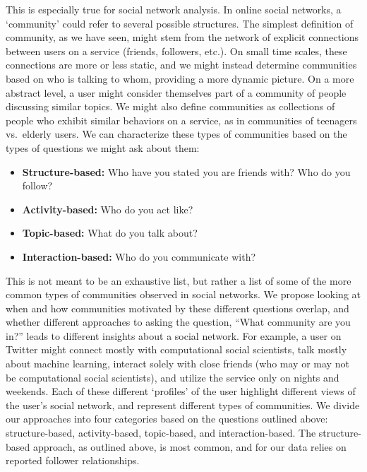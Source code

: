 This is especially true for social network analysis. In online social networks, a `community' could refer to several possible structures. The simplest definition of community, as we have seen, might stem from the network of explicit connections between users on a service (friends, followers, etc.). On small time scales, these connections are more or less static, and we might instead determine communities based on who is talking to whom, providing a more dynamic picture. On a more abstract level, a user might consider themselves part of a community of people discussing similar topics. We might also define communities as collections of people who exhibit similar behaviors on a service, as in communities of teenagers vs.\ elderly users. We can characterize these types of communities based on the types of questions we might ask about them:
\begin{itemize}
	\item \textbf{Structure-based:} Who have you stated you are friends with? Who do you follow?
	\item \textbf{Activity-based:} Who do you act like?
	\item \textbf{Topic-based:} What do you talk about?
	\item \textbf{Interaction-based:} Who do you communicate with?
\end{itemize}

This is not meant to be an exhaustive list, but rather a list of some of the more common types of communities observed in social networks. We propose looking at when and how communities motivated by these different questions overlap, and whether different approaches to asking the question, ``What community are you in?'' leads to different insights about a social network. For example, a user on Twitter might connect mostly with computational social scientists, talk mostly about machine learning, interact solely with close friends (who may or may not be computational social scientists), and utilize the service only on nights and weekends. Each of these different `profiles' of the user highlight different views of the user's social network, and represent different types of communities. We divide our approaches into four categories based on the questions outlined above: structure-based, activity-based, topic-based, and interaction-based. The structure-based approach, as outlined above, is most common, and for our data relies on reported follower relationships.

